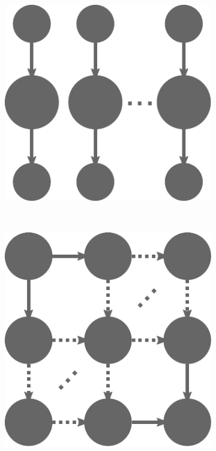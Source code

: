 \begin{figure}[h]
\begin{subfigure}{.2\textwidth}
        \centering
        \includegraphics[width=.8\linewidth]{imgs/estee/shapes/triplets}
        \caption{}
        \label{fig:tg-triplets}
    \end{subfigure}
    \\
    \begin{subfigure}{.2\textwidth}
        \centering
        \includegraphics[width=.8\linewidth]{imgs/estee/shapes/grid}
        \caption{}
        \label{fig:tg-grid}
    \end{subfigure}
    \begin{subfigure}{.2\textwidth}
        \centering

\end{subfigure}
\end{figure}
